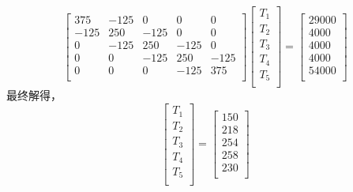 \begin{equation}
  \begin{bmatrix}
    375 & -125 & 0 & 0 & 0 \\
    -125 & 250 & -125 & 0 & 0  \\
    0 & -125 & 250 & -125 & 0   \\
    0 & 0 & -125 & 250 & -125  \\
    0 & 0 & 0 & -125 & 375 \\
  \end{bmatrix}
  \begin{bmatrix}
    T_{1} \\
    T_{2} \\
    T_{3} \\
    T_{4} \\
    T_{5} \\
  \end{bmatrix}
  =
  \begin{bmatrix}
    29000 \\
    4000 \\
    4000 \\
    4000 \\
    54000 \\
  \end{bmatrix}
\end{equation}
最终解得，
\begin{equation}
  \begin{bmatrix}
    T_{1} \\
    T_{2} \\
    T_{3} \\
    T_{4} \\
    T_{5} \\
  \end{bmatrix}
=
  \begin{bmatrix}
    150 \\
    218 \\
    254 \\
    258 \\
    230 \\
  \end{bmatrix}
\end{equation}

